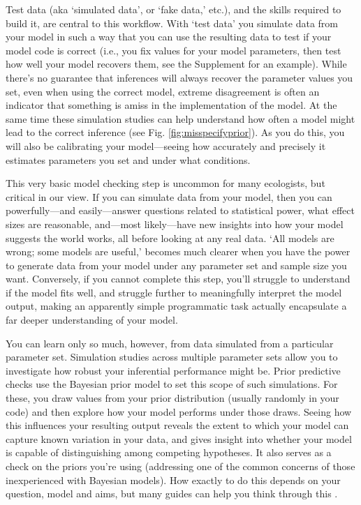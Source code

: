 \documentclass[11pt]{article}
\begin{document}
Test data (aka `simulated data', or  `fake data,' etc.), and the skills required to build it, are central to this workflow. With `test data' you simulate data from your model in such a way that you can use the resulting data to test if your model code is correct (i.e., you fix values for your model parameters, then test how well your model recovers them, see the Supplement for an example). While there's no guarantee that inferences will always recover the parameter values you set, even when using the correct model, extreme disagreement is often an indicator that something is amiss in the implementation of the model. At the same time these simulation studies can help understand how often a model might lead to the correct inference (see Fig. \ref{fig:misspecifyprior}). As you do this, you will also be calibrating your model---seeing how accurately and precisely it estimates parameters you set and under what conditions. 

This very basic model checking step is uncommon for many ecologists, but critical in our view. If you can simulate data from your model, then you can powerfully---and easily---answer questions related to statistical power, what effect sizes are reasonable, and---most likely---have new insights into how your model suggests the world works, all before looking at any real data. `All models are wrong; some models are useful,' becomes much clearer when you have the power to generate data from your model under any parameter set and sample size you want. Conversely, if you cannot complete this step, you'll struggle to understand if the model fits well, and struggle further to meaningfully interpret the model output, making an apparently simple programmatic task actually encapsulate a far deeper understanding of your model. 

You can learn only so much, however, from data simulated from a particular parameter set. Simulation studies across multiple parameter sets allow you to investigate how robust your inferential performance might be. Prior predictive checks use the Bayesian prior model to set this scope of such simulations. For these, you draw values from your prior distribution (usually randomly in your code) and then explore how your model performs under those draws. Seeing how this influences your resulting output reveals the extent to which your model can capture known variation in your data, and gives insight into whether your model is capable of distinguishing among competing hypotheses. It also serves as a check on the priors you're using (addressing one of the common concerns of those inexperienced with Bayesian models). How exactly to do this depends on your question, model and aims, but many guides can help you think through this \citep{betanprior,wesner2021,winter2023}. \\
\end{document}
